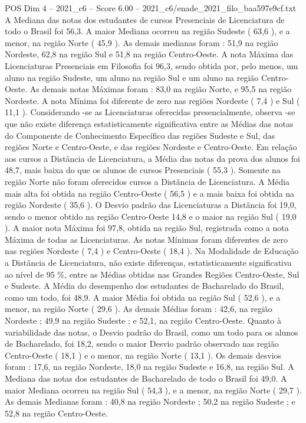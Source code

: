 \begin{textsample}{POS Dim 4 – 2021\_c6 – Score 6.00 – 2021\_c6/enade\_2021\_filo\_baa597e9cf.txt}
A Mediana das notas dos estudantes de cursos Presenciais de Licenciatura de todo o Brasil foi 56,3.
A maior Mediana ocorreu na região Sudeste ( 63,6 ), e a menor, na região Norte ( 45,9 ).
As demais medianas foram : 51,9 na região Nordeste, 62,8 na região Sul e 51,8 na região Centro-Oeste.
A nota Máxima das Licenciaturas Presenciais em Filosofia foi 96,3, sendo obtida por, pelo menos, um aluno na região Sudeste, um aluno na região Sul e um aluno na região Centro-Oeste.
As demais notas Máximas foram : 83,0 na região Norte, e 95,5 na região Nordeste.
A nota Mínima foi diferente de zero nas regiões Nordeste ( 7,4 ) e Sul ( 11,1 ).
Considerando -se as Licenciaturas oferecidas presencialmente, observa -se que não existe diferença estatisticamente significativa entre as Médias das notas do Componente de Conhecimento Específico das regiões Sudeste e Sul, das regiões Norte e Centro-Oeste, e das regiões Nordeste e Centro-Oeste.
Em relação aos cursos a Distância de Licenciatura, a Média das notas da prova dos alunos foi 48,7, mais baixa do que os alunos de cursos Presenciais ( 55,3 ).
Somente na região Norte não foram oferecidos cursos a Distância de Licenciatura.
A Média mais alta foi obtida na região Centro-Oeste ( 56,5 ) e a mais baixa foi obtida na região Nordeste ( 35,6 ).
O Desvio padrão das Licenciaturas a Distância foi 19,0, sendo o menor obtido na região Centro-Oeste 14,8 e o maior na região Sul ( 19,0 ).
A maior nota Máxima foi 97,8, obtida na região Sul, registrada como a nota Máxima de todas as Licenciaturas.
As notas Mínimas foram diferentes de zero nas regiões Nordeste ( 7,4 ) e Centro-Oeste ( 18,4 ).
Na Modalidade de Educação a Distância de Licenciatura, não existe diferenças, estatisticamente significativa ao nível de 95 \%, entre as Médias obtidas nas Grandes Regiões Centro-Oeste, Sul e Sudeste.
A Média do desempenho dos estudantes de Bacharelado do Brasil, como um todo, foi 48,9.
A maior Média foi obtida na região Sul ( 52,6 ), e a menor, na região Norte ( 29,6 ).
As demais Médias foram : 42,6, na região Nordeste ; 49,9 na região Sudeste ; e 52,1, na região Centro-Oeste.
Quanto à variabilidade das notas, o Desvio padrão do Brasil, como um todo para os alunos de Bacharelado, foi 18,2, sendo o maior Desvio padrão observado nas região Centro-Oeste ( 18,1 ) e o menor, na região Norte ( 13,1 ).
Os demais desvios foram : 17,6, na região Nordeste, 18,0 na região Sudeste e 16,8, na região Sul.
A Mediana das notas dos estudantes de Bacharelado de todo o Brasil foi 49,0.
A maior Mediana ocorreu na região Sul ( 54,3 ), e a menor, na região Norte ( 29,7 ).
As demais Medianas foram : 40,8 na região Nordeste ; 50,2 na região Sudeste ; e 52,8 na região Centro-Oeste.

\end{textsample}
